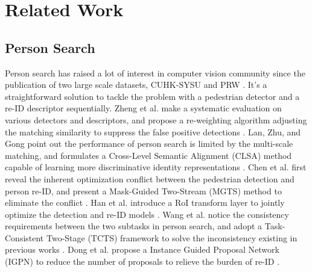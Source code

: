 \documentclass[letterpaper]{article} \usepackage{aaai21}  \usepackage{times}  \usepackage{helvet} \usepackage{courier}  \usepackage[hyphens]{url}  \usepackage{graphicx} \urlstyle{rm} \def\UrlFont{\rm}  \usepackage{natbib}  \usepackage{caption} \usepackage{multirow}
\begin{document}
\section{Related Work}
\subsection{Person Search}
Person search has raised a lot of interest in computer vision community since the publication of two large scale datasets, CUHK-SYSU \cite{oim} and PRW \cite{prw}. It's a straightforward solution to tackle the problem with a pedestrian detector and a re-ID descriptor sequentially. Zheng et al. make a systematic evaluation on various detectors and descriptors, and propose a re-weighting algorithm adjusting the matching similarity to suppress the false positive detections \cite{prw}. Lan, Zhu, and Gong point out the performance of person search is limited by the multi-scale matching, and formulates a Cross-Level Semantic Alignment (CLSA) method capable of learning more discriminative identity representations \cite{clsa}. Chen et al. first reveal the inherent optimization conflict between the pedestrian detection and person re-ID, and present a Mask-Guided Two-Stream (MGTS) method to eliminate the conflict \cite{mgts}. Han et al. introduce a RoI transform layer to jointly optimize the detection and re-ID models \cite{reid-driven}. Wang et al. notice the consistency requirements between the two subtasks in person search, and adopt a Task-Consistent Two-Stage (TCTS) framework to solve the inconsistency existing in previous works \cite{tcts}. Dong et al. propose a Instance Guided Proposal Network (IGPN) to reduce the number of proposals to relieve the burden of re-ID \cite{igpn}.
\end{document}
